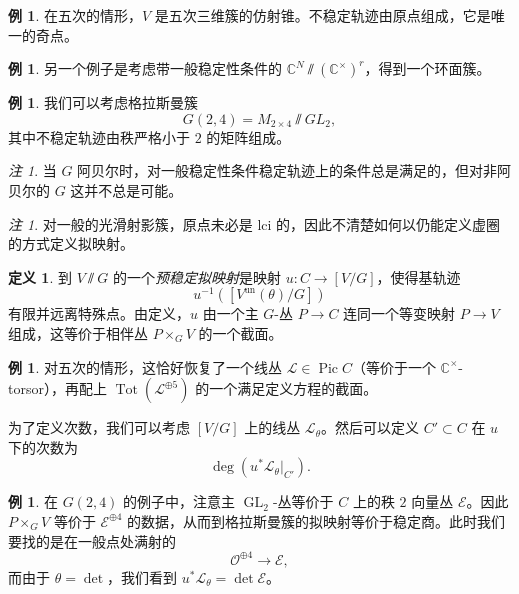 \documentclass{amsart}
\theoremstyle{definition}
\newtheorem{defn}[thm]{定义}
\newtheorem{exm}[thm]{例}
\theoremstyle{remark}
\newtheorem{rmk}[thm]{注}
\theoremstyle{plain}
\theoremstyle{definition}
\theoremstyle{remark}
\newcommand{\C}{\mathbb{C}}
\newcommand{\mc}[1]{\mathcal{#1}}
\newcommand{\mr}[1]{\mathrm{#1}}
\newcommand{\on}[1]{\operatorname{#1}}
\newcommand{\1}{\mathbf{1}}
\newcommand{\2}{\mathbf{2}}
\newcommand{\3}{\mathbf{3}}
\DeclareMathOperator{\Pic}{Pic}
\begin{document}
\begin{exm}
    在五次的情形，\(V\) 是五次三维簇的仿射锥。不稳定轨迹由原点组成，它是唯一的奇点。
\end{exm}

\begin{exm}
    另一个例子是考虑带一般稳定性条件的 \(\C^N \sslash (\C^{\times})^r\)，得到一个环面簇。
\end{exm}

\begin{exm}
    我们可以考虑格拉斯曼簇
    \[ G(2,4) = M_{2\times 4} \sslash GL_2, \]
    其中不稳定轨迹由秩严格小于 \(2\) 的矩阵组成。
\end{exm}

\begin{rmk}
    当 \(G\) 阿贝尔时，对一般稳定性条件稳定轨迹上的条件总是满足的，但对非阿贝尔的 \(G\) 这并不总是可能。
\end{rmk}

\begin{rmk}
    对一般的光滑射影簇，原点未必是 lci 的，因此不清楚如何以仍能定义虚圈的方式定义拟映射。
\end{rmk}

\begin{defn}
    到 \(V \sslash G\) 的一个\textit{预稳定拟映射}是映射 \(u \colon C \to [V/G]\)，使得基轨迹
    \[ u^{-1}([V^{\mr{un}}(\theta) / G]) \]
    有限并远离特殊点。由定义，\(u\) 由一个主 \(G\)-丛 \(P \to C\) 连同一个等变映射 \(P \to V\) 组成，这等价于相伴丛 \(P \times_G V\) 的一个截面。
\end{defn}

\begin{exm}
    对五次的情形，这恰好恢复了一个线丛 \(\mc{L} \in \Pic C\)（等价于一个 \(\C^{\times}\)-torsor），再配上 \(\on{Tot}(\mc{L}^{\oplus 5})\) 的一个满足定义方程的截面。
\end{exm}

为了定义次数，我们可以考虑 \([V/G]\) 上的线丛 \(\mc{L}_{\theta}\)。然后可以定义 \(C' \subset C\) 在 \(u\) 下的次数为
\[ \deg (u^* \mc{L}_{\theta}|_{C'}). \]

\begin{exm}
    在 \(G(2,4)\) 的例子中，注意主 \(\on{GL}_2\)-丛等价于 \(C\) 上的秩 \(2\) 向量丛 \(\mc{E}\)。因此 \(P \times_G V\) 等价于 \(\mc{E}^{\oplus 4}\) 的数据，从而到格拉斯曼簇的拟映射等价于稳定商。此时我们要找的是在一般点处满射的
    \[ \mc{O}^{\oplus 4} \to \mc{E}, \]
    而由于 \(\theta = \det\)，我们看到 \(u^* \mc{L}_{\theta} = \det \mc{E}\)。
\end{exm}
\end{document}
